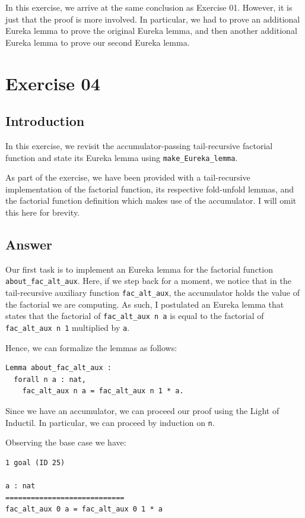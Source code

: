 \documentclass{article}
\begin{document}
In this exercise, we arrive at the same conclusion as Exercise 01. However, it is just that the proof is more involved. In particular, we had to prove an additional Eureka lemma to prove the original Eureka lemma, and then another additional Eureka lemma to prove our second Eureka lemma.

\section{Exercise 04}

\subsection{Introduction}
In this exercise, we revisit the accumulator-passing tail-recursive factorial function and state its Eureka lemma using \texttt{make\_Eureka\_lemma}. 

As part of the exercise, we have been provided with a tail-recursive implementation of the factorial function, its respective fold-unfold lemmas, and the factorial function definition which makes use of the accumulator. I will omit this here for brevity.

\subsection{Answer}

Our first task is to implement an Eureka lemma for the factorial function \texttt{about\_fac\_alt\_aux}. Here, if we step back for a moment, we notice that in the tail-recursive auxiliary function \texttt{fac\_alt\_aux}, the accumulator holds the value of the factorial we are computing. As such, I postulated an Eureka lemma that states that the factorial of \texttt{fac\_alt\_aux n a} is equal to the factorial of \texttt{fac\_alt\_aux n 1} multiplied by \texttt{a}.

Hence, we can formalize the lemmas as follows:

\begin{lstlisting}
Lemma about_fac_alt_aux :
  forall n a : nat,
    fac_alt_aux n a = fac_alt_aux n 1 * a.
\end{lstlisting}

Since we have an accumulator, we can proceed our proof using the Light of Inductil. In particular, we can proceed by induction on \texttt{n}.

Observing the base case we have: 

\begin{lstlisting}
1 goal (ID 25)

a : nat
============================
fac_alt_aux 0 a = fac_alt_aux 0 1 * a
\end{lstlisting}
\end{document}

